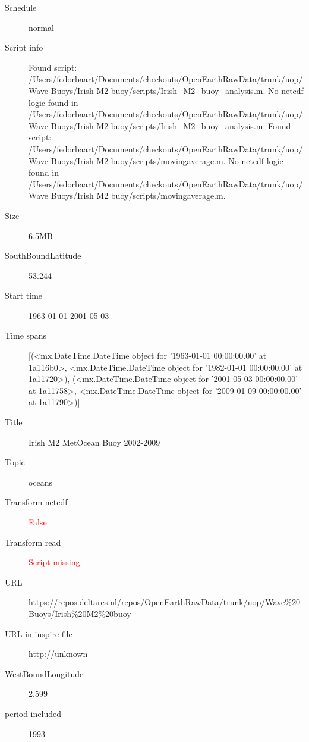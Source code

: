 \documentclass[9]{report}
\begin{document}
\begin{description}
\begin{verbatim}
\end{verbatim}
  \item[Schedule] normal
  \item[Script info] Found script: /Users/fedorbaart/Documents/checkouts/OpenEarthRawData/trunk/uop/Wave Buoys/Irish M2 buoy/scripts/Irish\_M2\_buoy\_analysis.m.
No netcdf logic found in /Users/fedorbaart/Documents/checkouts/OpenEarthRawData/trunk/uop/Wave Buoys/Irish M2 buoy/scripts/Irish\_M2\_buoy\_analysis.m.
Found script: /Users/fedorbaart/Documents/checkouts/OpenEarthRawData/trunk/uop/Wave Buoys/Irish M2 buoy/scripts/movingaverage.m.
No netcdf logic found in /Users/fedorbaart/Documents/checkouts/OpenEarthRawData/trunk/uop/Wave Buoys/Irish M2 buoy/scripts/movingaverage.m.
  \item[Size] 6.5MB
  \item[SouthBoundLatitude] 53.244
  \item[Start time] 1963-01-01 2001-05-03
  \item[Time spans] [(<mx.DateTime.DateTime object for '1963-01-01 00:00:00.00' at 1a116b0>, <mx.DateTime.DateTime object for '1982-01-01 00:00:00.00' at 1a11720>), (<mx.DateTime.DateTime object for '2001-05-03 00:00:00.00' at 1a11758>, <mx.DateTime.DateTime object for '2009-01-09 00:00:00.00' at 1a11790>)]
  \item[Title]  Irish M2 MetOcean Buoy 2002-2009 
  \item[Topic] oceans
  \item[Transform netcdf] \textcolor{red}{False}
  \item[Transform read] \textcolor{red}{Script missing}
  \item[URL] \href{https://repos.deltares.nl/repos/OpenEarthRawData/trunk/uop/Wave\%20Buoys/Irish\%20M2\%20buoy}{https://repos.deltares.nl/repos/OpenEarthRawData/trunk/uop/Wave\%20Buoys/Irish\%20M2\%20buoy}
  \item[URL in inspire file] \href{http://unknown}{http://unknown}
  \item[WestBoundLongitude] 2.599
  \item[period included] 1993
\end{description}
\end{document}

